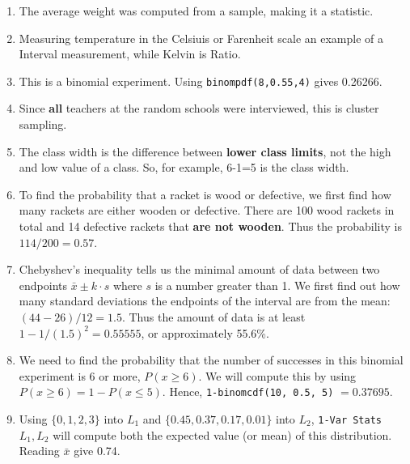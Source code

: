 \documentclass{article}
\newcommand{\answer}[1]{{\color{red}{\large \textbf{#1}}}}
\begin{document}
\pagestyle{myheadings}

\begin{center}
\textbf{}
\end{center}

\begin{enumerate}

\item \answer{B} The average weight was computed from a sample, making it a statistic.

\item \answer{C} Measuring temperature in the Celsiuis or Farenheit scale an example of a Interval measurement, while Kelvin is Ratio.

\item \answer{B} This is a binomial experiment. Using \texttt{binompdf(8,0.55,4)} gives 0.26266.

\item \answer{B} Since {\bf all} teachers at the random schools were interviewed, this is cluster sampling.

\item \answer{B} The class width is the difference between {\bf lower class limits}, not the high and low value of a class. So, for example, 6-1=5 is the class width.

\item \answer{B} To find the probability that a racket is wood or defective, we first find how many rackets are either wooden or defective. There are 100 wood rackets in total and 14 defective rackets that {\bf are not wooden}. Thus the probability is $114/200=0.57$.

\item \answer{A} Chebyshev's inequality tells us the minimal amount of data between two endpoints $\bar{x} \pm k\cdot s$ where $s$ is a number greater than 1. We first find out how many standard deviations the endpoints of the interval are from the mean: $(44-26)/12=1.5$. Thus the amount of data is at least $1-1/(1.5)^2 = 0.55555$, or approximately 55.6\%.

\item \answer{B} We need to find the probability that the number of successes in this binomial experiment is 6 or more, $P(x\geq 6)$. We will compute this by using $P(x\geq 6) = 1 - P(x\leq 5)$. Hence, \texttt{1-binomcdf(10, 0.5, 5)} $=0.37695$.

\item \answer{D} Using $\{0,1,2,3\}$ into $L_1$ and $\{0.45, 0.37, 0.17, 0.01\}$ into $L_2$, \texttt{1-Var Stats} $L_1, L_2$ will compute both the expected value (or mean) of this distribution. Reading $\bar{x}$ give 0.74.


\end{enumerate}
\end{document}
